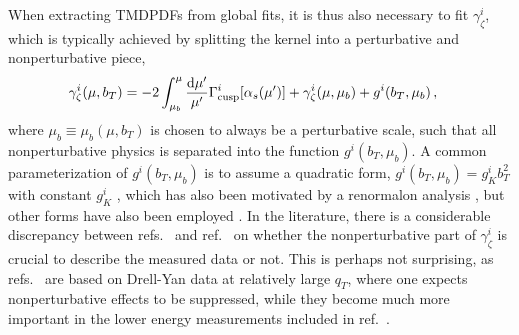 \documentclass[11pt,a4paper]{article}
\DeclareRobustCommand{\mycite}[1]{ref.~\cite{#1}}
\DeclareRobustCommand{\mycites}[1]{refs.~\cite{#1}}
\newcommand{\df}{\mathrm{d}}
\newcommand{\as}{\alpha_s}
\newcommand{\GammaC}{\Gamma_{\rm cusp}}
\begin{document}
When extracting TMDPDFs from global fits, it is thus also necessary to fit $\gamma_\zeta^i$, which is typically achieved by splitting the kernel into a perturbative and nonperturbative piece,
\begin{align}\label{eq:gamma_zeta_split}
 \gamma_\zeta^i(\mu,b_T) &= -2 \int_{\mu_b}^\mu \frac{\df\mu'}{\mu'} \GammaC^i[\as(\mu')] + \gamma_\zeta^i(\mu, \mu_b)  + g^i(b_T,\mu_b)
\,,\end{align}
where $\mu_b \equiv \mu_b(\mu, b_T)$ is chosen to always be a perturbative scale, such that all nonperturbative physics is separated into the function $g^i(b_T,\mu_b)$.
A common parameterization of $g^i(b_T,\mu_b)$ is to assume a quadratic form, $g^i(b_T,\mu_b) = g^i_K b_T^2$ with constant $g_K^i$ \cite{Bacchetta:2017gcc,Scimemi:2017etj}, which has also been motivated by a renormalon analysis \cite{Scimemi:2016ffw}, but other forms have also been employed \cite{Bertone:2019nxa,Vladimirov:2019bfa}.
In the literature, there is a considerable discrepancy between \mycites{Scimemi:2017etj,Bertone:2019nxa} and \mycite{Bacchetta:2017gcc} on whether the nonperturbative part of $\gamma_\zeta^i$ is crucial to describe the measured data or not.
This is perhaps not surprising, as \mycites{Scimemi:2017etj,Bertone:2019nxa} are based on Drell-Yan data at relatively large $q_T$, where one expects nonperturbative effects to be suppressed, while they become much more important in the lower energy measurements included in \mycite{Bacchetta:2017gcc}.
\end{document}
